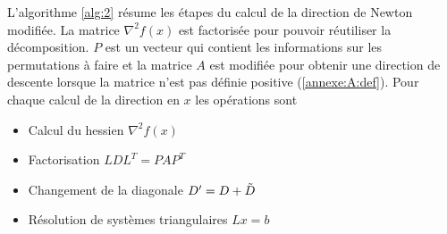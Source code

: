 \noindent
L'algorithme \ref{alg:2} r\'esume les \'etapes du calcul de la direction de Newton modifi\'ee.
La matrice $\nabla^2 f(x)$ est factoris\'ee pour pouvoir r\'eutiliser la d\'ecomposition. 
$P$ est un vecteur qui contient les informations sur les permutations \`a faire et la matrice $A$ est
modifi\'ee pour obtenir une direction de descente lorsque la matrice n'est pas d\'efinie positive (\ref{annexe:A:def}).
Pour chaque calcul de la direction en $x$ les op\'erations sont 
\begin{itemize}
\item Calcul du hessien $\nabla^2 f(x)$
\item Factorisation $LDL^T=PAP^T$
\item Changement de la diagonale $D'=D+\Tilde{D}$
\item R\'esolution de syst\`emes triangulaires $Lx=b$ 
\end{itemize}

